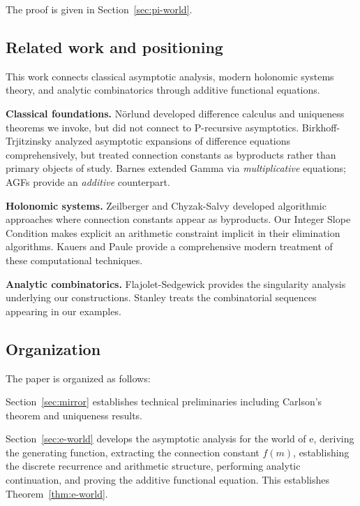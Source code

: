 \documentclass[11pt,reqno]{amsart}
\theoremstyle{definition}
\newcommand{\ee}{\mathrm{e}}
\numberwithin{equation}{section}
\begin{document}
The proof is given in Section~\ref{sec:pi-world}.

\subsection{Related work and positioning}

This work connects classical asymptotic analysis, modern holonomic systems theory, and analytic combinatorics through additive functional equations.

\textbf{Classical foundations.} Nörlund \cite{Norlund1924} developed difference calculus and uniqueness theorems we invoke, but did not connect to P-recursive asymptotics. Birkhoff-Trjitzinsky \cite{BirkhoffTrjitzinsky1933} analyzed asymptotic expansions of difference equations comprehensively, but treated connection constants as byproducts rather than primary objects of study. Barnes \cite{Barnes1901} extended Gamma via \emph{multiplicative} equations; AGFs provide an \emph{additive} counterpart.

\textbf{Holonomic systems.} Zeilberger \cite{Zeilberger1990,Zeilberger1991} and Chyzak-Salvy \cite{ChyzakSalvy1998} developed algorithmic approaches where connection constants appear as byproducts. Our Integer Slope Condition makes explicit an arithmetic constraint implicit in their elimination algorithms. Kauers and Paule \cite{KauersPaule2011} provide a comprehensive modern treatment of these computational techniques.

\textbf{Analytic combinatorics.} Flajolet-Sedgewick \cite{FlajoletSedgewick2009} provides the singularity analysis underlying our constructions. Stanley \cite{Stanley1999} treats the combinatorial sequences appearing in our examples.

\subsection{Organization}

The paper is organized as follows: 

Section~\ref{sec:mirror} establishes technical preliminaries including Carlson's theorem and uniqueness results.

Section~\ref{sec:e-world} develops the asymptotic analysis for the world of $\ee$, deriving the generating function, extracting the connection constant $f(m)$, establishing the discrete recurrence and arithmetic structure, performing analytic continuation, and proving the additive functional equation. This establishes Theorem~\ref{thm:e-world}.
\end{document}
